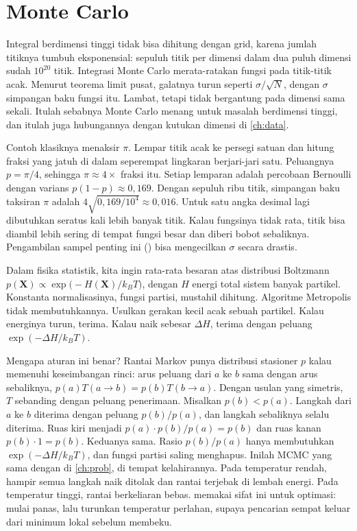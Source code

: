 \section{Monte Carlo}

Integral berdimensi tinggi tidak bisa dihitung dengan grid, karena jumlah titiknya tumbuh eksponensial: sepuluh titik per
dimensi dalam dua puluh dimensi sudah $10^{20}$ titik. Integrasi Monte Carlo merata-ratakan fungsi pada titik-titik acak.
Menurut teorema limit pusat, galatnya turun seperti $\sigma/\sqrt N$, dengan $\sigma$ simpangan baku fungsi itu. Lambat, tetapi
tidak bergantung pada dimensi sama sekali. Itulah sebabnya Monte Carlo menang untuk masalah berdimensi tinggi, dan itulah
juga hubungannya dengan kutukan dimensi di \cref{ch:data}.

Contoh klasiknya menaksir $\pi$. Lempar titik acak ke persegi satuan dan hitung fraksi yang jatuh di dalam seperempat
lingkaran berjari-jari satu. Peluangnya $p=\pi/4$, sehingga $\pi\approx4\times$ fraksi itu. Setiap lemparan adalah percobaan
Bernoulli dengan varians $p(1-p)\approx0{,}169$. Dengan sepuluh ribu titik, simpangan baku taksiran $\pi$ adalah
$4\sqrt{0{,}169/10^4}\approx0{,}016$. Untuk satu angka desimal lagi dibutuhkan seratus kali lebih banyak titik. Kalau
fungsinya tidak rata, titik bisa diambil lebih sering di tempat fungsi besar dan diberi bobot sebaliknya. Pengambilan sampel
penting ini () bisa mengecilkan $\sigma$ secara drastis.

Dalam fisika statistik, kita ingin rata-rata besaran atas distribusi Boltzmann $p(\bm X)\propto\exp\big(-H(\bm X)/k_BT\big)$,
dengan $H$ energi total sistem banyak partikel. Konstanta normalisasinya, fungsi partisi, mustahil dihitung. Algoritme
Metropolis \citep{metropolis1953} tidak membutuhkannya. Usulkan gerakan kecil acak sebuah partikel. Kalau energinya turun,
terima. Kalau naik sebesar $\Delta H$, terima dengan peluang $\exp(-\Delta H/k_BT)$.

Mengapa aturan ini benar? Rantai Markov punya distribusi stasioner $p$ kalau memenuhi keseimbangan rinci: arus peluang
dari $a$ ke $b$ sama dengan arus sebaliknya, $p(a)T(a\to b)=p(b)T(b\to a)$. Dengan usulan yang simetris, $T$ sebanding dengan
peluang penerimaan. Misalkan $p(b)<p(a)$. Langkah dari $a$ ke $b$ diterima dengan peluang $p(b)/p(a)$, dan langkah sebaliknya
selalu diterima. Ruas kiri menjadi $p(a)\cdot p(b)/p(a)=p(b)$ dan ruas kanan $p(b)\cdot1=p(b)$. Keduanya sama. Rasio $p(b)/p(a)$
hanya membutuhkan $\exp(-\Delta H/k_BT)$, dan fungsi partisi saling menghapus. Inilah MCMC yang sama dengan di
\cref{ch:prob}, di tempat kelahirannya. Pada temperatur rendah, hampir semua langkah naik ditolak dan rantai terjebak di
lembah energi. Pada temperatur tinggi, rantai berkeliaran bebas.  memakai sifat ini untuk
optimasi: mulai panas, lalu turunkan temperatur perlahan, supaya pencarian sempat keluar dari minimum lokal sebelum membeku.

